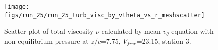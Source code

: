 \begin{figure}[H]
\centering
\texttt{[image: figs/run\_25/run\_25\_turb\_visc\_by\_vtheta\_vs\_r\_meshscatter]}
\caption{Scatter plot of total viscosity $\nu$ calculated by mean $\bar{v}_{\theta}$ equation with non-equilibrium pressure at $z/c$=7.75, $V_{free}$=23.15, station 3.}
\label{fig:run_25_turb_visc_by_vtheta_vs_r_meshscatter}
\end{figure}


